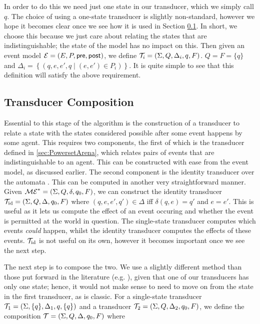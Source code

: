 \documentclass[10pt, a4paper]{report}
\begin{document}
In order to do this we need just one state in our transducer, which we simply
call $q$. The choice of using a one-state transducer is slightly non-standard,
however we hope it becomes clear once we see how it is used in Section
\ref{sec:TransducerComposition}. In short, we choose this because we just care
about relating the states that are indistinguishable; the state of the model has
no impact on this. Then given an event model $\mathcal{E} = (E, P, \textsf{pre}, \textsf{post})$, we
define $\mathcal{T}_i = (\Sigma, Q, \Delta_i, q, F)$. $Q = F = \{q\}$ and $\Delta_i =
\left\{ (q, e, e', q \mid (e, e') \in P_i) \right\}$. It is quite simple to see
that this definition will satisfy the above requirement.

\subsection{Transducer Composition}
\label{sec:TransducerComposition}

Essential to this stage of the algorithm is the construction of a transducer to
relate a state with the states considered possible after some event happens by
some agent. This requires two components, the first of which is the transducer
defined in \ref{sec:PowersetArena}, which relates pairs of events that are
indistinguishable to an agent. This can be constructed with ease from the event
model, as discussed earlier. The second component is the identity transducer
over the automata \mestar. This can be computed in another very straightforward
manner. Given $\mathcal{ME}^\ast = (\Sigma, Q, \delta, q_0, F)$, we can construct the
identity transducer $\mathcal{T}_{\text{id}} = (\Sigma, Q, \Delta, q_0, F)$ where
$(q, e, e', q') \in \Delta$ iff $\delta(q, e) = q'$ and $e = e'$. This is useful
as it lets us compute the effect of an event occuring and whether the event is
permitted at the world in question. The single-state transducer computes which
events \emph{could} happen, whilst the identity transducer computes the effects
of these events. $\mathcal{T}_{\text{id}}$ is not useful on its own, however it
becomes important once we see the next step.

The next step is to compose the two. We use a slightly different method than
those put forward in the literature (e.g. \cite{ComposingFSTs}), given that one of
our transducers has only one state; hence, it would not make sense to need to
move on from the state in the first transducer, as is classic. For a
single-state transducer $\mathcal{T}_1 = (\Sigma, \{q\}, \Delta_1, q, \{q\})$ and
a transducer $\mathcal{T}_2 = (\Sigma, Q, \Delta_2, q_0, F)$, we define the
composition $\mathcal{T} = (\Sigma, Q, \Delta, q_0, F)$ where 
\end{document}
